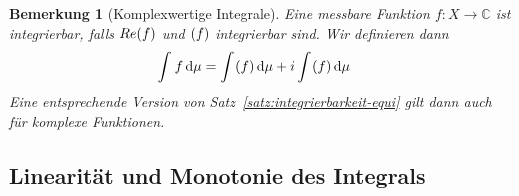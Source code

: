 \documentclass[11pt, twoside, a4paper]{article}
\theoremstyle{plain}
\newtheorem{bemerkung}[blockelement]{Bemerkung}
\numberwithin{equation}{subsection}
\newcommand{\of}[1]{\mathopen{}\mathclose{}\bgroup\left(#1\aftergroup\egroup\right)}
\newcommand{\dif}{\mathop{}\!\mathrm{d}}
\let\Re\relax
\let\Im\relax
\DeclareMathOperator{\Re}{Re}
\DeclareMathOperator{\Im}{Im}
\newcommand{\C}{\mathbb{C}}
\begin{document}
    \begin{bemerkung}[Komplexwertige Integrale]
        Eine messbare Funktion $f: X \to\C$ ist integrierbar, falls $Re\of{f}$ und $\Im\of{f}$ integrierbar sind. Wir definieren dann
        \begin{align*}
            \int_{}^{} f \dif \mu &= \int_{}^{} \Re\of{f} \dif \mu + i\int_{}^{} \Im\of{f} \dif \mu
        \end{align*}
        Eine entsprechende Version von Satz~\ref{satz:integrierbarkeit-equi} gilt dann auch für komplexe Funktionen.
    \end{bemerkung}

    \subsection{Linearität und Monotonie des Integrals}
\end{document}
